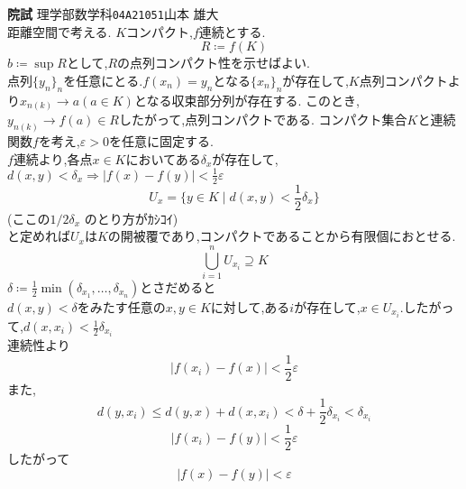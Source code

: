 \documentclass[leqno]{ltjsarticle}%
\begin{document}
{\textbf{\Large{院試}}}\hspace{\fill} {理学部数学科\texttt{\Large{04A21051}}}{\Large{山本 雄大}}\\
距離空間で考える.
$K$コンパクト,$f$連続とする.
\[R \coloneq f(K)\]
$b\coloneq \sup R$として,$R$の点列コンパクト性を示せばよい. \\
点列$\{y_n\}_n$を任意にとる.$f(x_n)=y_n$となる$\{x_n\}_n$が存在して,$K$点列コンパクトより$x_{n(k)}\to a (a\in K)$となる収束部分列が存在する.
このとき,$y_{n(k)}\to f(a) \in R$したがって,点列コンパクトである.
コンパクト集合$K$と連続関数$f$を考え,$\varepsilon > 0$を任意に固定する.\\
$f$連続より,各点$x\in K$においてある$\delta_{x}$が存在して,$d(x,y) < \delta_{x} \Longrightarrow |f(x) - f(y) | < \frac12\varepsilon $\\
\[U_x = \{y \in K \mid d(x,y) < \frac12 \delta_x\}\] 
(ここの$1/2 \delta_x$ のとり方がｶｼｺｲ)\\
と定めれば$U_x$は$K$の開被覆であり,コンパクトであることから有限個におとせる.
\[\bigcup_{i=1}^n U_{x_i} \supseteq K\]
$\delta \coloneq \frac12 \min(\delta_{x_1},\ldots , \delta_{x_n})$とさだめると\\
$d(x,y)< \delta$をみたす任意の$x,y \in K $に対して,ある$i$が存在して,$x\in U_{x_i}$.したがって,$d(x,x_i) < \frac12 \delta_{x_i}$\\
連続性より
\[|f(x_i) - f(x) |< \frac12 \varepsilon\]
また,
\[d(y,x_i) \leq d(y,x) + d(x,x_i) < \delta + \frac12 \delta_{x_i} < \delta_{x_i}\]
\[|f(x_i) - f(y)| < \frac12 \varepsilon\]
したがって
\[|f(x) - f(y)|<\varepsilon \]
\end{document}
